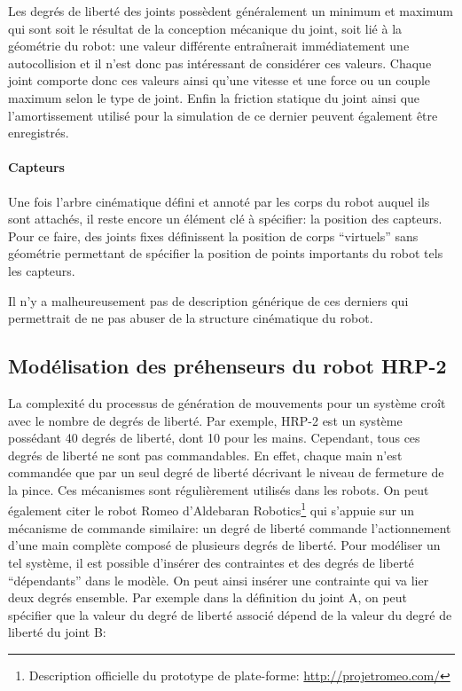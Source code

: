 Les degrés de liberté des joints possèdent généralement un minimum et
maximum qui sont soit le résultat de la conception mécanique du joint,
soit lié à la géométrie du robot: une valeur différente entraînerait
immédiatement une autocollision et il n'est donc pas intéressant de
considérer ces valeurs. Chaque joint comporte donc ces valeurs ainsi
qu'une vitesse et une force ou un couple maximum selon le type de
joint. Enfin la friction statique du joint ainsi que l'amortissement
utilisé pour la simulation de ce dernier peuvent également être
enregistrés.


\paragraph{Capteurs}

Une fois l'arbre cinématique défini et annoté par les corps du robot
auquel ils sont attachés, il reste encore un élément clé à spécifier:
la position des capteurs. Pour ce faire, des joints fixes définissent
la position de corps ``virtuels'' sans géométrie permettant de
spécifier la position de points importants du robot tels les capteurs.

Il n'y a malheureusement pas de description générique de ces derniers
qui permettrait de ne pas abuser de la structure cinématique du robot.


\subsection{Modélisation des préhenseurs du robot HRP-2}

La complexité du processus de génération de mouvements pour un système
croît avec le nombre de degrés de liberté. Par exemple,
HRP-2 est un système possédant 40 degrés de
liberté, dont 10 pour les mains. Cependant,
tous ces degrés de liberté ne sont pas commandables. En effet, chaque
main n'est commandée que par un seul degré de liberté décrivant le
niveau de fermeture de la pince. Ces mécanismes sont régulièrement
utilisés dans les robots. On peut également citer le robot Romeo
d'Aldebaran Robotics\footnote{Description officielle du prototype de
  plate-forme: \url{http://projetromeo.com/}} qui s'appuie sur un
mécanisme de commande similaire: un degré de liberté commande
l'actionnement d'une main complète composé de plusieurs degrés de
liberté. Pour modéliser un tel système, il est possible d'insérer des
contraintes et des degrés de liberté ``dépendants'' dans le modèle. On
peut ainsi insérer une contrainte qui va lier deux degrés
ensemble. Par exemple dans la définition du joint A, on peut spécifier
que la valeur du degré de liberté associé dépend de la valeur du degré
de liberté du joint B:

